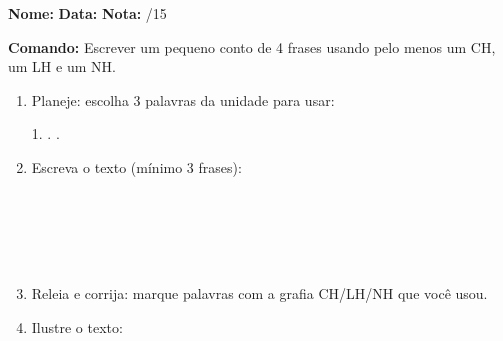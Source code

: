 

\begin{exercicio}

\noindent\textbf{Nome:} \underline{\hspace{3.2cm}} \quad \textbf{Data:} \underline{\hspace{1.6cm}} \quad \textbf{Nota:} \underline{\hspace{0.9cm}}/15


\noindent\textbf{Comando:} Escrever um pequeno conto de 4 frases usando pelo menos um CH, um LH e um NH.


\begin{enumerate}

  \item Planeje: escolha 3 palavras da unidade para usar:
  \begin{center}
  1. \underline{\hspace{3cm}} . \underline{\hspace{3cm}} . \underline{\hspace{3cm}}
  \end{center}

  \item Escreva o texto (mínimo 3 frases):
  \begin{center}
  \underline{\hspace{12cm}}\\\underline{\hspace{12cm}}\\\underline{\hspace{12cm}}\\\underline{\hspace{12cm}}\\\underline{\hspace{12cm}}
  \end{center}

  \item Releia e corrija: marque palavras com a grafia CH/LH/NH que você usou.

  \item Ilustre o texto:
  \begin{center}
  \end{center}

\end{enumerate}

\end{exercicio}

